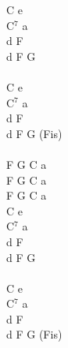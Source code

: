 \documentclass[a5paper, 10pt]{book}
\begin{document}
\begin{minipage}[t]{0.2\textwidth}
C e\\
C$^7$ a\\
d F\\
d F G\\
\\
C e\\
C$^7$ a\\
d F\\
d F G (Fis)\\
\\
F G C a\\
F G C a\\
F G C a\\

C e\\
C$^7$ a\\
d F\\
d F G\\
\\
C e\\
C$^7$ a\\
d F\\
d F G (Fis)\\
\\
\end{minipage}

\newpage
\end{document}
